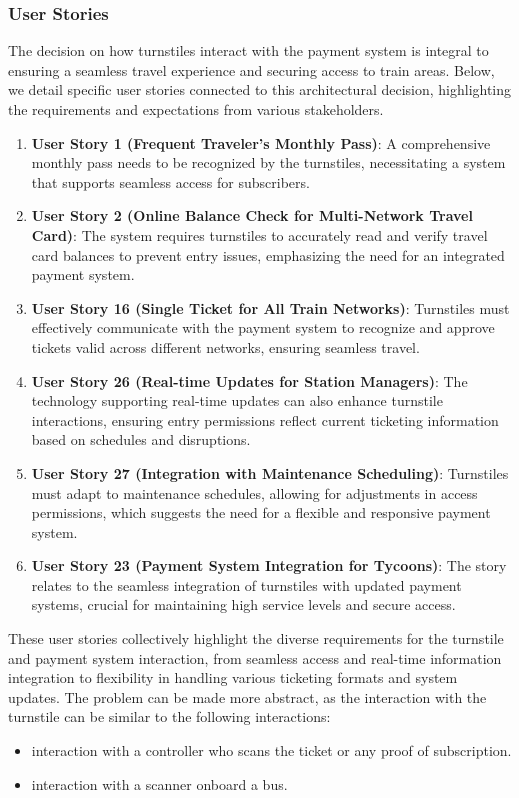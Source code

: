 \subsubsection*{User Stories}
The decision on how turnstiles interact with the payment system is integral to ensuring a seamless travel experience and securing access to train areas. Below, we detail specific user stories connected to this architectural decision, highlighting the requirements and expectations from various stakeholders.

\begin{enumerate}[noitemsep]
    \item \textbf{User Story 1 (Frequent Traveler's Monthly Pass)}: A comprehensive monthly pass needs to be recognized by the turnstiles, necessitating a system that supports seamless access for subscribers.  
    \item \textbf{User Story 2 (Online Balance Check for Multi-Network Travel Card)}: The system requires turnstiles to accurately read and verify travel card balances to prevent entry issues, emphasizing the need for an integrated payment system.    
    \item \textbf{User Story 16 (Single Ticket for All Train Networks)}: Turnstiles must effectively communicate with the payment system to recognize and approve tickets valid across different networks, ensuring seamless travel.   
    \item \textbf{User Story 26 (Real-time Updates for Station Managers)}: The technology supporting real-time updates can also enhance turnstile interactions, ensuring entry permissions reflect current ticketing information based on schedules and disruptions.
    \item \textbf{User Story 27 (Integration with Maintenance Scheduling)}: Turnstiles must adapt to maintenance schedules, allowing for adjustments in access permissions, which suggests the need for a flexible and responsive payment system.
    \item \textbf{User Story 23 (Payment System Integration for Tycoons)}: The story relates to the seamless integration of turnstiles with updated payment systems, crucial for maintaining high service levels and secure access.
\end{enumerate}

These user stories collectively highlight the diverse requirements for the turnstile and payment system interaction, from seamless access and real-time information integration to flexibility in handling various ticketing formats and system updates.
The problem can be made more abstract, as the interaction with the turnstile can be similar to the following interactions:
\begin{itemize}
    \item interaction with a controller who scans the ticket or any proof of subscription.
    \item interaction with a scanner onboard a bus.
\end{itemize}

